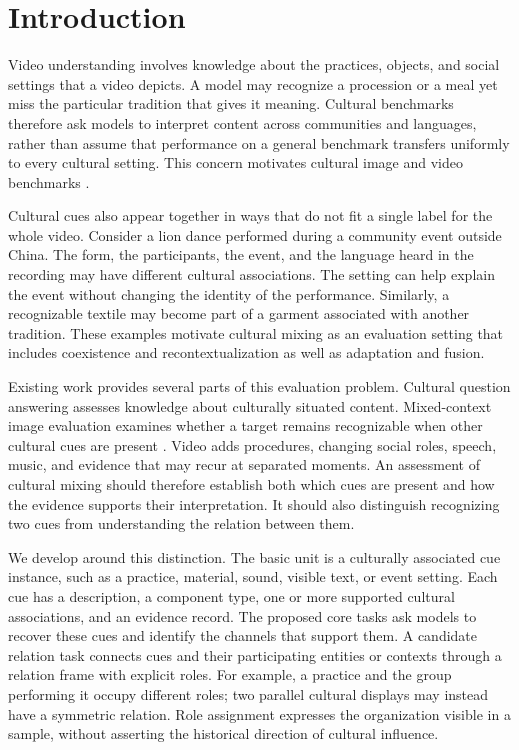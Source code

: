 \section{Introduction}
\label{sec:introduction}

Video understanding involves knowledge about the practices, objects, and social settings that a video depicts.
A model may recognize a procession or a meal yet miss the particular tradition that gives it meaning.
Cultural benchmarks therefore ask models to interpret content across communities and languages, rather than assume that performance on a general benchmark transfers uniformly to every cultural setting.
This concern motivates cultural image and video benchmarks
\citep{nayak-etal-2024-benchmarking,shafique-etal-2025-culturally,Singh_2026_CVPR}.

Cultural cues also appear together in ways that do not fit a single label for the whole video.
Consider a lion dance performed during a community event outside China.
The form, the participants, the event, and the language heard in the recording may have different cultural associations.
The setting can help explain the event without changing the identity of the performance.
Similarly, a recognizable textile may become part of a garment associated with another tradition.
These examples motivate cultural mixing as an evaluation setting that includes coexistence and recontextualization as well as adaptation and fusion.

Existing work provides several parts of this evaluation problem.
Cultural question answering assesses knowledge about culturally situated content.
Mixed-context image evaluation examines whether a target remains recognizable when other cultural cues are present \citep{Kim_2026_CVPR}.
Video adds procedures, changing social roles, speech, music, and evidence that may recur at separated moments.
An assessment of cultural mixing should therefore establish both which cues are present and how the evidence supports their interpretation.
It should also distinguish recognizing two cues from understanding the relation between them.

We develop \benchmark{} around this distinction.
The basic unit is a culturally associated cue instance, such as a practice, material, sound, visible text, or event setting.
Each cue has a description, a component type, one or more supported cultural associations, and an evidence record.
The proposed core tasks ask models to recover these cues and identify the channels that support them.
A candidate relation task connects cues and their participating entities or contexts through a relation frame with explicit roles.
For example, a practice and the group performing it occupy different roles; two parallel cultural displays may instead have a symmetric relation.
Role assignment expresses the organization visible in a sample, without asserting the historical direction of cultural influence.

